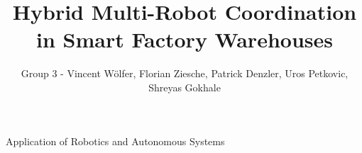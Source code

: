 \documentclass[journal]{IEEEtran}
\begin{document}
%
\title{Hybrid Multi-Robot Coordination in Smart Factory Warehouses}
%
%
%


\author{Group 3 - Vincent W\"olfer, Florian Ziesche, Patrick Denzler, Uros Petkovic, Shreyas Gokhale}

% 
%




%
{Application of Robotics and Autonomous Systems}



% 
\end{document}
